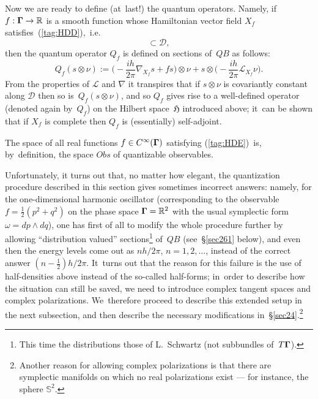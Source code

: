 \documentclass[11pt]{amsart}
\numberwithin{equation}{section}
\theoremstyle{remark}
\let\Bbb\mathbb \let\Cal\mathcal \let\frak\mathfrak
\newcommand\Obs{Obs}
\newcommand\Omg{{\bigam}}   %
\newcommand\DD{{\Cal D}}
\newcommand\LL{\Cal L}
\newcommand\HH{\mathfrak H}
\newcommand\RR{\mathbb R}
\newcommand{\bigam}{\mbox{\boldmath $\Gamma$}}
\begin{document}
Now we are ready to define (at~last!) the quantum operators. Namely, if
$f:\Omg\to\RR$ is a smooth function whose Hamiltonian vector field $X_f$
satisfies~(\ref{tag:HDD}),~i.e.
\begin{equation}  [X_f,\DD]\subset\DD,   \label{tag:HDE}  \end{equation}
then the quantum operator $Q_f$ is defined on sections of~$QB$ as follows:
\begin{equation}  Q_f(s\otimes\nu) := \Big( -\frac{ih}{2\pi} \nabla_{X_f} s +
fs\Big) \otimes\nu + s\otimes\Big(-\frac{ih}{2\pi} \LL_{X_f} \nu \Big).
\label{tag:HDF}  \end{equation}
From the properties of $\LL$ and $\nabla$ it transpires that if $s\otimes\nu$
is covariantly constant along $\DD$ then so is~$Q_f(s\otimes\nu)$, and so $Q_f$
gives rise to a well-defined operator (denoted again by~$Q_f$) on the Hilbert
space~$\HH$ introduced above; it~can be shown that if $X_f$ is complete then
$Q_f$ is (essentially) self-adjoint.

The space of all real functions $f\in C^\infty(\Omg)$ satisfying
(\ref{tag:HDE})~is, by~definition, the space $\Obs$ of quantizable observables.


Unfortunately, it turns out that, no matter how elegant, the quantization
procedure described in this section gives sometimes incorrect answers: namely,
for the one-dimensional harmonic oscillator (corresponding to the observable
$f=\frac12(p^2+q^2)$ on the phase space $\Omg=\RR^2$ with the usual symplectic
form $\omega=dp\wedge dq$), one has first of all to modify the whole procedure
further by allowing ``distribution valued'' sections\footnote{This time the
distributions  those of L.~Schwartz (not subbundles of~$T\Omg$).}
of~$QB$ (see~\S\ref{sec261} below), and even then the energy levels come out as
$nh/2\pi$, $n=1,2,\dots$, instead of the correct answer $(n-\frac12)h/2\pi$.
It~turns out that the reason for this failure is the use of half-densities
above instead of the so-called half-forms; in~order to describe how the
situation can still be saved, we need to introduce complex tangent spaces and
complex polarizations. We~therefore proceed to describe this extended setup
in the next subsection, and then describe the necessary modifications
in~\S\ref{sec24}.\footnote{Another reason for allowing complex polarizations is
that there are symplectic manifolds on which no real polarizations exist ---
for instance, the sphere $\Bbb S^2$.}
\end{document}
